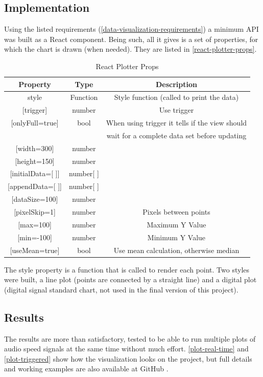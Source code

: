 \subsection{Implementation}
Using the listed requirements (\autoref{data-visualization-requirements}) a minimum
API was built as a React component. Being such, all it gives is a set of properties,
for which the chart is drawn (when needed). They are listed in \autoref{react-plotter-props}.
\begin{table}[htb]
  \ABNTEXreducedfont
  \caption[React Plotter Props]{React Plotter Props}
  \label{react-plotter-props}
  \centering
  \begin{tabular}{c|c|c}
    \textbf{Property} & \textbf{Type} & \textbf{Description} \\
    \hline \hline
    style &	Function & Style function (called to print the data) \\
    \hline
    {[trigger]} &	number & Use trigger \\
    \hline
    {[onlyFull=true]}	& bool & When using trigger it tells if the view should \\
                      &      & wait for a complete data set before updating \\
    \hline
    {[width=300]} &	number \\
    \hline
    {[height=150]} & number \\
    \hline
    {[initialData=[ ]]} & number{[ ]} \\
    \hline
    {[appendData=[ ]]} & number{[ ]} \\
    \hline
    {[dataSize=100]} & number \\
    \hline
    {[pixelSkip=1]} &	number &	Pixels between points \\
    \hline
    {[max=100]} &	number & Maximum Y Value \\
    \hline
    {[min=-100]} & number & Minimum Y Value \\
    \hline
    {[useMean=true]} & bool & Use mean calculation, otherwise median  \\
  \end{tabular}
\end{table}
The style property is a function that is called to render each point. Two styles
were built, a line plot (points are connected by a straight line) and a digital
plot (digital signal standard chart, not used in the final version of this project).

\subsection{Results}
The results are more than satisfactory, tested to be able to run multiple plots
of audio speed signals at the same time without much effort. \autoref{plot-real-time}
and \autoref{plot-triggered} show how the visualization looks on the
project, but full details and working examples are also available at GitHub
\cite{react-plotter}.

